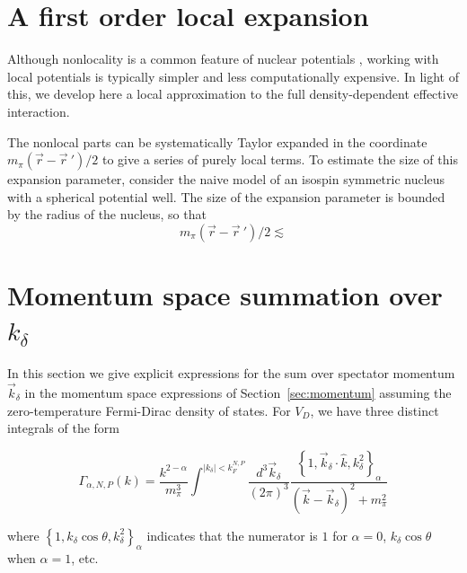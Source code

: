 \documentclass[%
 preprint,
 amsmath,amssymb,
 aps,
]{revtex4-1}
\begin{document}
\section{\label{sec:local}A first order local expansion}

Although nonlocality is a common feature of nuclear potentials \cite{PhysRevC.53.R1483}, working with local potentials is typically simpler and less computationally expensive. In light of this, we develop here a local approximation to the full density-dependent effective interaction.

The nonlocal parts can be systematically Taylor expanded in the coordinate $m_\pi(\vec{r}-\vec{r}\:')/2$ to give a series of purely local terms. To estimate the size of this expansion parameter, consider the naive model of an isospin symmetric nucleus with a spherical potential well. The size of the expansion parameter is bounded by the radius of the nucleus, so that 
\begin{equation}
m_\pi(\vec{r}-\vec{r}\:')/2 \lesssim 
\end{equation}

\appendix

\section{\label{app:momSums} Momentum space summation over $k_\delta$}

In this section we give explicit expressions for the sum over spectator momentum $\vec{k}_\delta$ in the momentum space expressions of Section~\ref{sec:momentum} assuming the zero-temperature Fermi-Dirac density of states. For $V_D$, we have three distinct integrals  of the form

\begin{equation}
\Gamma_{\alpha,N,P}(k) = \frac{k^{2-\alpha}}{m_\pi^3}\int^{|k_\delta|<k_F^{N,P}}\frac{d^3\vec{k}_\delta}{(2\pi)^3}  \frac{\left\{1,\vec{k}_\delta\cdot\hat{k},k_\delta^2\right\}_\alpha}{(\vec{k}-\vec{k}_\delta)^2+m_\pi^2}
\end{equation}

where $\left\{1,k_\delta\cos\theta,k_\delta^2\right\}_\alpha$ indicates that the numerator is $1$ for $\alpha=0$, $k_\delta\cos\theta$ when $\alpha=1$, etc.
\end{document}
